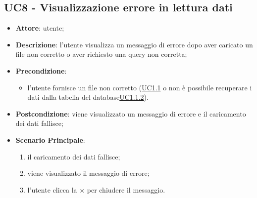 \subsection{UC8 - Visualizzazione errore in lettura dati}
    \label{uc8}
    \begin{itemize}
    \item \textbf{Attore}: utente;
    \item \textbf{Descrizione}: l'utente visualizza un messaggio di errore dopo aver caricato un file non corretto o aver richiesto una query non corretta;
    \item \textbf{Precondizione}: 
    \begin{itemize}
        \item l'utente fornisce un file non corretto (\hyperref[uc1.1]{UC1.1} o non è possibile recuperare i dati dalla tabella del database\hyperref[uc1.1.2]{UC1.1.2}).
    \end{itemize}  
    \item \textbf{Postcondizione}: viene visualizzato un messaggio di errore e il caricamento dei dati fallisce;
    \item \textbf{Scenario Principale}: 
    \begin{enumerate}
        \item il caricamento dei dati fallisce;
        \item viene visualizzato il messaggio di errore;
        \item l'utente clicca la $\times$ per chiudere il messaggio.
    \end{enumerate}
    \end{itemize}
